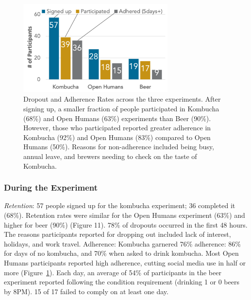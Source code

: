 \begin{figure}[h]
\centering
  \includegraphics[width=0.7\textwidth]{figures/galileo/galileo-study3-1}
  \caption[Dropout and Adherence Rates across the three experiments]
{Dropout and Adherence Rates across the three experiments. After signing up, a smaller fraction of people participated in Kombucha (68\%) and Open Humans (63\%) experiments than Beer (90\%). However, those who participated reported greater adherence in Kombucha (92\%) and Open Humans (83\%) compared to Open Humans (50\%). Reasons for non-adherence included being busy, annual leave, and brewers needing to check on the taste of Kombucha. }
  \label{fig:galileo-result3-1}
\end{figure}

\subsubsection{During the Experiment}
\textit{Retention}: 57 people signed up for the kombucha experiment; 36 completed it (68\%). Retention rates were similar for the Open Humans experiment (63\%) and higher for beer (90\%) (Figure 11). 78\% of dropouts occurred in the first 48 hours. The reasons participants reported for dropping out included lack of interest, holidays, and work travel.
Adherence: Kombucha garnered 76\% adherence: 86\% for days of no kombucha, and 70\% when asked to drink kombucha. Most Open Humans participants reported high adherence, cutting social media use in half or more (Figure~\ref{fig:galileo-result3-1}). Each day, an average of 54\% of participants in the beer experiment reported following the condition requirement (drinking 1 or 0 beers by 8PM). 15 of 17 failed to comply on at least one day.


